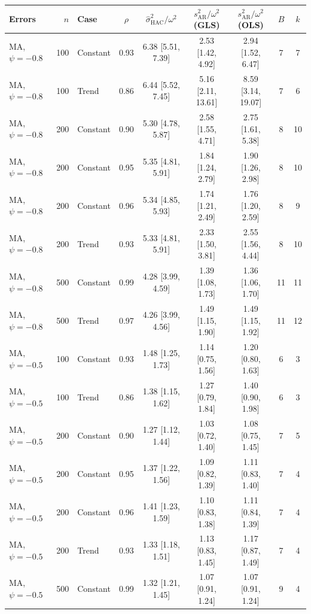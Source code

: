 \begin{tabular}{lrlcccccc}
\toprule
Errors & $n$ & Case & $\rho$ & $\hat\sigma^2_{\mathrm{HAC}}/\omega^2$ & $s^2_{\mathrm{AR}}/\omega^2$ (GLS) & $s^2_{\mathrm{AR}}/\omega^2$ (OLS) & $B$ & $k$ \\
\midrule
MA, $\psi = -0.8$ & 100 & Constant & 0.93 & 6.38 [5.51, 7.39] & 2.53 [1.42, 4.92] & 2.94 [1.52, 6.47] & 7 & 7 \\
MA, $\psi = -0.8$ & 100 & Trend & 0.86 & 6.44 [5.52, 7.45] & 5.16 [2.11, 13.61] & 8.59 [3.14, 19.07] & 7 & 6 \\
MA, $\psi = -0.8$ & 200 & Constant & 0.90 & 5.30 [4.78, 5.87] & 2.58 [1.55, 4.71] & 2.75 [1.61, 5.38] & 8 & 10 \\
MA, $\psi = -0.8$ & 200 & Constant & 0.95 & 5.35 [4.81, 5.91] & 1.84 [1.24, 2.79] & 1.90 [1.26, 2.98] & 8 & 10 \\
MA, $\psi = -0.8$ & 200 & Constant & 0.96 & 5.34 [4.85, 5.93] & 1.74 [1.21, 2.49] & 1.76 [1.20, 2.59] & 8 & 9 \\
MA, $\psi = -0.8$ & 200 & Trend & 0.93 & 5.33 [4.81, 5.91] & 2.33 [1.50, 3.81] & 2.55 [1.56, 4.44] & 8 & 10 \\
MA, $\psi = -0.8$ & 500 & Constant & 0.99 & 4.28 [3.99, 4.59] & 1.39 [1.08, 1.73] & 1.36 [1.06, 1.70] & 11 & 11 \\
MA, $\psi = -0.8$ & 500 & Trend & 0.97 & 4.26 [3.99, 4.56] & 1.49 [1.15, 1.90] & 1.49 [1.15, 1.92] & 11 & 12 \\
\addlinespace
MA, $\psi = -0.5$ & 100 & Constant & 0.93 & 1.48 [1.25, 1.73] & 1.14 [0.75, 1.56] & 1.20 [0.80, 1.63] & 6 & 3 \\
MA, $\psi = -0.5$ & 100 & Trend & 0.86 & 1.38 [1.15, 1.62] & 1.27 [0.79, 1.84] & 1.40 [0.90, 1.98] & 6 & 3 \\
MA, $\psi = -0.5$ & 200 & Constant & 0.90 & 1.27 [1.12, 1.44] & 1.03 [0.72, 1.40] & 1.08 [0.75, 1.45] & 7 & 5 \\
MA, $\psi = -0.5$ & 200 & Constant & 0.95 & 1.37 [1.22, 1.56] & 1.09 [0.82, 1.39] & 1.11 [0.83, 1.40] & 7 & 4 \\
MA, $\psi = -0.5$ & 200 & Constant & 0.96 & 1.41 [1.23, 1.59] & 1.10 [0.83, 1.38] & 1.11 [0.84, 1.39] & 7 & 4 \\
MA, $\psi = -0.5$ & 200 & Trend & 0.93 & 1.33 [1.18, 1.51] & 1.13 [0.83, 1.45] & 1.17 [0.87, 1.49] & 7 & 4 \\
MA, $\psi = -0.5$ & 500 & Constant & 0.99 & 1.32 [1.21, 1.45] & 1.07 [0.91, 1.24] & 1.07 [0.91, 1.24] & 9 & 4 \\

\end{tabular}
